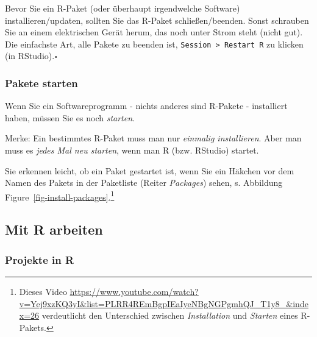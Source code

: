 \documentclass[
  letterpaper,
  DIV=11,
  numbers=noendperiod]{scrartcl}
\theoremstyle{definition}
\theoremstyle{definition}
\theoremstyle{definition}
\theoremstyle{remark}
\begin{document}
\begin{tcolorbox}[enhanced jigsaw, coltitle=black, colframe=quarto-callout-caution-color-frame, opacityback=0, toprule=.15mm, opacitybacktitle=0.6, arc=.35mm, titlerule=0mm, toptitle=1mm, title=\textcolor{quarto-callout-caution-color}{\faFire}\hspace{0.5em}{Caution}, bottomtitle=1mm, leftrule=.75mm, breakable, rightrule=.15mm, colbacktitle=quarto-callout-caution-color!10!white, bottomrule=.15mm, colback=white, left=2mm]

Bevor Sie ein R-Paket (oder überhaupt irgendwelche Software)
installieren/updaten, sollten Sie das R-Paket schließen/beenden. Sonst
schrauben Sie an einem elektrischen Gerät herum, das noch unter Strom
steht (nicht gut). Die einfachste Art, alle Pakete zu beenden ist,
\texttt{Session\ \textgreater{}\ Restart\ R} zu klicken (in
RStudio).\(\square\)

\end{tcolorbox}

\subsubsection{Pakete starten}\label{pakete-starten}

Wenn Sie ein Softwareprogramm - nichts anderes sind R-Pakete -
installiert haben, müssen Sie es noch \emph{starten}.

Merke: Ein bestimmtes R-Paket muss man nur \emph{einmalig installieren}.
Aber man muss es \emph{jedes Mal neu starten}, wenn man R (bzw. RStudio)
startet.

Sie erkennen leicht, ob ein Paket gestartet ist, wenn Sie ein Häkchen
vor dem Namen des Pakets in der Paketliste (Reiter \emph{Packages})
sehen, s. Abbildung Figure~\ref{fig-install-packages}.\footnote{Dieses
  Video
  \url{https://www.youtube.com/watch?v=Yej9xzKQ3yI&list=PLRR4REmBgpIEaIyeNBgNGPgmhQJ_T1y8_&index=26}
  verdeutlicht den Unterschied zwischen \emph{Installation} und
  \emph{Starten} eines R-Pakets.}

\subsection{Mit R arbeiten}\label{mit-r-arbeiten}

\subsubsection{Projekte in R}\label{projekte-in-r}
\end{document}
